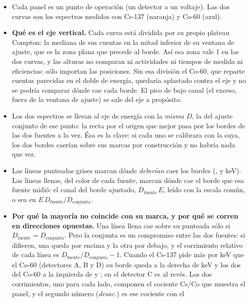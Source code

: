\documentclass[11pt,a4paper]{article}
\begin{document}
\begin{itemize}
\item Cada panel es un punto de operación (un detector a un voltaje). Las dos
      curvas son los espectros medidos con Cs-137 (naranja) y Co-60 (azul).
\item \textbf{Qué es el eje vertical.} Cada curva está dividida por su propio
      plateau Compton: la mediana de sus cuentas en la mitad inferior de su
      ventana de ajuste, que es la zona plana que precede al borde. Así esa
      zona vale 1 en las dos curvas, y las alturas no comparan ni actividades
      ni tiempos de medida ni eficiencias: sólo importan las posiciones. Sin
      esa división el Co-60, que reparte cuentas parecidas en el doble de
      energía, quedaría aplastado contra el eje y no se podría comparar dónde
      cae cada borde. El pico de bajo canal (el exceso, fuera de la ventana de
      ajuste) se sale del eje a propósito.
\item Los dos espectros se llevan al eje de energía con la \emph{misma} $D$,
      la del ajuste conjunto de ese punto: la recta por el origen que mejor
      pasa por los bordes de las dos fuentes a la vez. Ésa es la clave: si cada
      uno se calibrara con la suya, los dos bordes caerían sobre sus marcas
      por construcción y no habría nada que ver.
\item Las líneas punteadas grises marcan dónde \emph{deberían} caer los bordes
      (\BordeCs, \BordeCoA{} y \BordeCoB{} keV). Las líneas llenas, del color
      de cada fuente, marcan dónde cae el borde que esa fuente midió: el canal
      del borde ajustado, $D_{\mathrm{fuente}}\,E$, leído con la escala común,
      o sea en $E\,D_{\mathrm{fuente}}/D_{\mathrm{conjunta}}$.
\item \textbf{Por qué la mayoría no coincide con su marca, y por qué se
      corren en direcciones opuestas.} Una línea llena cae sobre su punteada
      sólo si $D_{\mathrm{fuente}} = D_{\mathrm{conjunta}}$. Pero la conjunta
      es un compromiso entre las dos fuentes: si difieren, una queda por
      encima y la otra por debajo, y el corrimiento relativo de cada línea es
      $D_{\mathrm{fuente}}/D_{\mathrm{conjunta}} - 1$. Cuando el Cs-137 pide
      más \mVns{} por keV que el Co-60 (detectores A, B y D) su borde queda a
      la derecha de \BordeCs{} keV y los dos del Co-60 a la izquierda de
      \BordeCoA{} y \BordeCoB; en el detector C es al revés. Los dos
      corrimientos, uno para cada lado, componen el cociente Cs/Co que muestra
      el panel, y el segundo número (\emph{desac.}) es ese cociente con el

\end{itemize}
\end{document}
